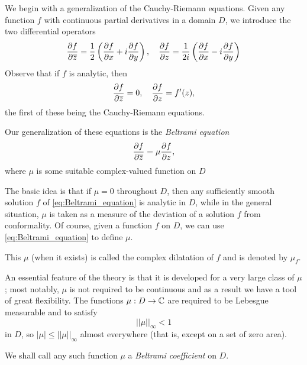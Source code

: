 We begin with a generalization of the Cauchy-Riemann equations. Given any
function $f$ with continuous partial derivatives in a domain $D$, we introduce
the two differential operators
\begin{equation*}
    \frac{\partial f}{\partial\overline{z}} = \frac{1}{2}\left(\frac{\partial f}{\partial x} + i \frac{\partial f}{\partial y}\right), \quad \frac{\partial f}{\partial z} = \frac{1}{2i}\left(\frac{\partial f}{\partial x} - i \frac{\partial f}{\partial y}\right)
\end{equation*}
Observe that if $f$ is analytic, then
\begin{equation*}
    \frac{\partial f}{\partial\overline{z}} = 0, \quad \frac{\partial f}{\partial z} = f'(z),
\end{equation*}
the first of these being the Cauchy-Riemann equations. 

\begin{definition}
    Our generalization of these equations is the
    \emph{Beltrami equation}
    \begin{equation}
        \label{eq:Beltrami_equation}
        \frac{\partial f}{\partial\overline{z}} = \mu \frac{\partial f}{\partial z},
    \end{equation}
    where $\mu$ is some suitable complex-valued function on $D$
\end{definition}

The basic idea is that if $\mu = 0$ throughout $D$, then any sufficiently smooth
solution $f$ of \eqref{eq:Beltrami_equation} is analytic in $D$, while in the
general situation, $\mu$ is taken as a measure of the deviation of a solution
$f$ from conformality. Of course, given a function $f$ on $D$, we can use
\eqref{eq:Beltrami_equation} to define $\mu$.

\begin{definition}
    This $\mu$ (when it exists) is called the complex dilatation of $f$ and is
    denoted by $\mu_f$.
\end{definition}

An essential feature of the theory is that it is developed for a very large
class of $\mu$; most notably, $\mu$ is not required to be continuous and as a
result we have a tool of great flexibility. The functions $\mu: D \to \mathbb{C}$ are
required to be Lebesgue measurable and to satisfy
\begin{equation}
    \label{eq:condition_for_mu_to_be_Beltrami_coefficient}
    ||\mu||_\infty < 1
\end{equation}
in $D$, so $|\mu| \leq ||\mu||_\infty$ almost everywhere (that is, except on a
set of zero area).

\begin{definition}
    We shall call any such function $\mu$ a \emph{Beltrami coefficient} on $D$.
\end{definition}

